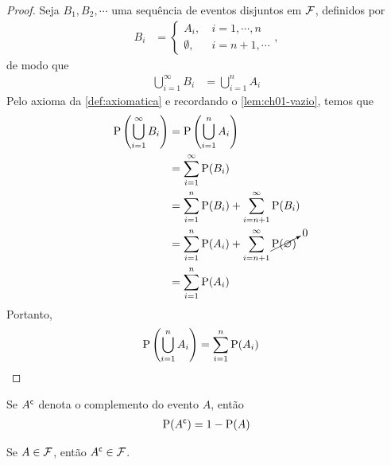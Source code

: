 \begin{proof}
    Seja $B_1, B_2, \cdots$ uma sequência de eventos disjuntos em $\operatorname{\mathcal{F}}$,
    definidos por
    \begin{align*}
        B_i &= \begin{cases}
            A_i,&\ i = 1,\cdots,n \\
            \emptyset,&\ i = n + 1,\cdots
        \end{cases},
    \end{align*}
    de modo que
    \begin{align*}
        \bigcup_{i=1}^\infty B_i &= \bigcup_{i=1}^n A_i
    \end{align*}
    Pelo axioma  da \cref{def:axiomatica}
    e recordando o \cref{lem:ch01-vazio}, temos que
    \begin{align*}
        \operatorname{P}\left(\bigcup_{i=1}^\infty B_i\right)
            &= \operatorname{P}\left(\bigcup_{i=1}^n A_i\right) \\
            &= \sum_{i=1}^\infty \operatorname{P}(B_i) \\
            &= \sum_{i=1}^n \operatorname{P}(B_i) + \sum_{i=n+1}^\infty \operatorname{P}(B_i) \\
            &= \sum_{i=1}^n \operatorname{P}(A_i)
            +  \sum_{i=n+1}^\infty \cancelto{0}{\operatorname{P}(\varnothing)} \\
            &= \sum_{i=1}^n \operatorname{P}(A_i)
    \end{align*}
    Portanto,
    \begin{align*}
        \operatorname{P}\left(\bigcup_{i=1}^n A_i\right) 
            &= \sum_{i=1}^n \operatorname{P}(A_i)
    \end{align*}
\end{proof}

\begin{lemma}\label{lem:ch01-complemento}
    Se ${A}^{\mathsf{c}}$ denota o complemento do evento $A$, então
    \begin{align}
        \operatorname{P}({A}^{\mathsf{c}}) = 1 - \operatorname{P}(A) \label{eq:ch01-complemento}
    \end{align}

    \begin{obs}
        Se $A \in \operatorname{\mathcal{F}}$, então ${A}^{\mathsf{c}} \in \operatorname{\mathcal{F}}$.
    \end{obs}
\end{lemma}


